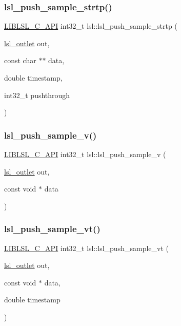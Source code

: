 \subsubsection{\texorpdfstring{lsl\+\_\+push\+\_\+sample\+\_\+strtp()}{lsl\_push\_sample\_strtp()}}
{\footnotesize\ttfamily \hyperlink{lsl__cpp_8h_aafd0ef1813e8be84a1420c4f1df64615}{L\+I\+B\+L\+S\+L\+\_\+\+C\+\_\+\+A\+PI} int32\+\_\+t lsl\+::lsl\+\_\+push\+\_\+sample\+\_\+strtp (\begin{DoxyParamCaption}\item[{\hyperlink{namespacelsl_abcf512b0f66dacf86c10b165995fd50b}{lsl\+\_\+outlet}}]{out,  }\item[{const char $\ast$$\ast$}]{data,  }\item[{double}]{timestamp,  }\item[{int32\+\_\+t}]{pushthrough }\end{DoxyParamCaption})}

\mbox{\label{namespacelsl_a25ee57785d5ab7143605ee9f59c1a0cf}} 
\subsubsection{\texorpdfstring{lsl\+\_\+push\+\_\+sample\+\_\+v()}{lsl\_push\_sample\_v()}}
{\footnotesize\ttfamily \hyperlink{lsl__cpp_8h_aafd0ef1813e8be84a1420c4f1df64615}{L\+I\+B\+L\+S\+L\+\_\+\+C\+\_\+\+A\+PI} int32\+\_\+t lsl\+::lsl\+\_\+push\+\_\+sample\+\_\+v (\begin{DoxyParamCaption}\item[{\hyperlink{namespacelsl_abcf512b0f66dacf86c10b165995fd50b}{lsl\+\_\+outlet}}]{out,  }\item[{const void $\ast$}]{data }\end{DoxyParamCaption})}

\mbox{\label{namespacelsl_a8032f4283b186f0f8b8e657f6642e062}} 
\subsubsection{\texorpdfstring{lsl\+\_\+push\+\_\+sample\+\_\+vt()}{lsl\_push\_sample\_vt()}}
{\footnotesize\ttfamily \hyperlink{lsl__cpp_8h_aafd0ef1813e8be84a1420c4f1df64615}{L\+I\+B\+L\+S\+L\+\_\+\+C\+\_\+\+A\+PI} int32\+\_\+t lsl\+::lsl\+\_\+push\+\_\+sample\+\_\+vt (\begin{DoxyParamCaption}\item[{\hyperlink{namespacelsl_abcf512b0f66dacf86c10b165995fd50b}{lsl\+\_\+outlet}}]{out,  }\item[{const void $\ast$}]{data,  }\item[{double}]{timestamp }\end{DoxyParamCaption})}

